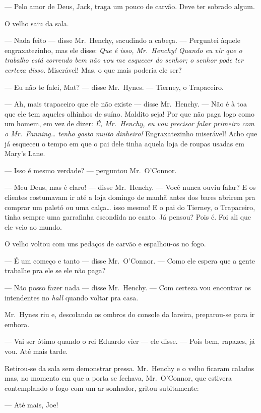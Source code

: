--- Pelo amor de Deus, Jack, traga um pouco de carvão.  Deve ter sobrado algum.

O velho saiu da sala.

--- Nada feito --- disse Mr.~Henchy, sacudindo a cabeça.  --- Perguntei àquele
engraxatezinho, mas ele disse: \textit{Que é isso, Mr.~Henchy!
Quando eu vir que o trabalho está correndo bem não vou me esquecer do
senhor; o senhor pode ter certeza disso}.  Miserável!  Mas, o que mais
poderia ele ser?

--- Eu não te falei, Mat? --- disse Mr.~Hynes.  --- Tierney, o Trapaceiro.

--- Ah, mais trapaceiro que ele não existe --- disse Mr.~Henchy.  --- Não é à
toa que ele tem aqueles olhinhos de suíno.  Maldito seja!  Por que não paga
logo como um homem, em vez de dizer: \textit{É, Mr.~Henchy, eu vou
precisar falar primeiro com o Mr.~Fanning\ldots{} tenho gasto muito
dinheiro!} Engraxatezinho miserável!  Acho que já esqueceu o tempo em que o pai
dele tinha aquela loja de roupas usadas em Mary’s Lane.

--- Isso é mesmo verdade? --- perguntou Mr.~O’Connor.

--- Meu Deus, mas é claro! --- disse Mr.~Henchy.  --- Você nunca ouviu falar?
E os clientes costumavam ir até a loja domingo de manhã antes dos bares abrirem
pra comprar um paletó ou uma calça\ldots{} isso mesmo!  E o pai do Tierney, o
Trapaceiro, tinha sempre uma garrafinha escondida no canto.  Já pensou?  Pois
é.  Foi ali que ele veio ao mundo.

O velho voltou com uns pedaços de carvão e espalhou-os no fogo.

--- É um começo e tanto --- disse Mr.~O’Connor.  --- Como ele espera que a
gente trabalhe pra ele se ele não paga?

--- Não posso fazer nada --- disse Mr.~Henchy.  --- Com certeza vou encontrar
os intendentes no \textit{hall} quando voltar pra casa.

Mr.~Hynes riu e, descolando os ombros do console da lareira, preparou-se para
ir embora.

--- Vai ser ótimo quando o rei Eduardo vier --- ele disse.  --- Pois bem,
rapazes, já vou.  Até mais tarde.

Retirou-se da sala sem demonstrar pressa.  Mr.~Henchy e o velho ficaram calados
mas, no momento em que a porta se fechava, Mr.~O’Connor, que estivera
contemplando o fogo com um ar sonhador, gritou subitamente:

--- Até mais, Joe!


